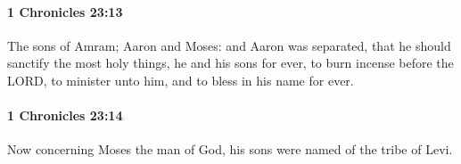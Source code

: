 		\paragraph{1 Chronicles 23:13} %
			\label{1CHRONICLES-23-13}

			The sons of Amram; Aaron and Moses: and Aaron was separated, that he should sanctify the most holy things, he and his sons for ever, to burn incense before the LORD, to minister unto him, and to bless in his name for ever.


		\paragraph{1 Chronicles 23:14} %
			\label{1CHRONICLES-23-14}

			Now concerning Moses the man of God, his sons were named of the tribe of Levi.


